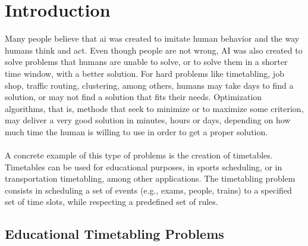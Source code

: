 \setcounter{secnumdepth}{2}
\chapter{Introduction}
\label{introduction}
\thispagestyle{plain}

Many people believe that \gls{ai} was created to imitate human behavior and the way humans think and act. Even though people are not wrong, AI was also created to solve problems that humans are unable to solve, or to solve them in a shorter time window, with a better solution. For hard problems like timetabling, job shop, traffic routing, clustering, among others, humans may take days to find a solution, or may not find a solution that fits their needs. Optimization algorithms, that is, methods that seek to minimize or to maximize some criterion, may deliver a very good solution in minutes, hours or days, depending on how much time the human is willing to use in order to get a proper solution.\\
\\
A concrete example of this type of problems is the creation of timetables. Timetables can be used for educational purposes, in sports scheduling, or in transportation timetabling, among other applications. The timetabling problem consists in scheduling a set of events (e.g., exams, people, trains) to a specified set of time slots, while respecting a predefined set of rules.

\section{Educational Timetabling Problems}

